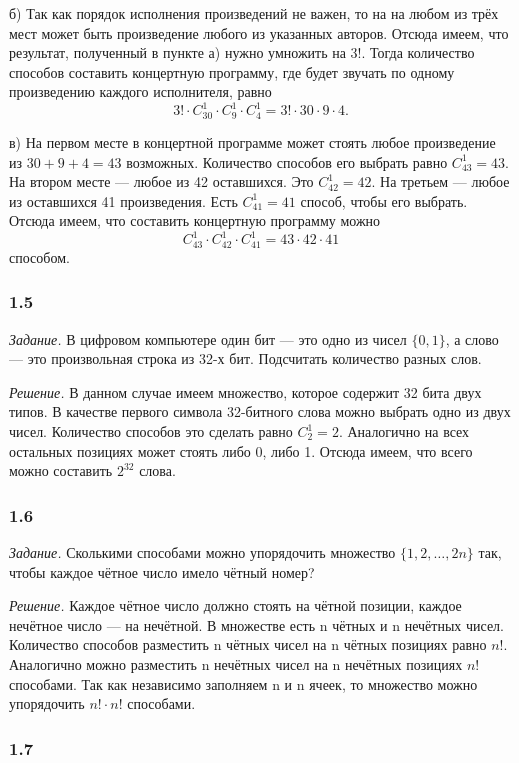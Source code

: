 \documentclass{book}
\begin{document}
б) Так как порядок исполнения произведений не важен, то на на любом из трёх мест может быть произведение любого из указанных авторов. Отсюда имеем, что результат, полученный в пункте а) нужно умножить на $3!$. Тогда количество способов составить концертную программу, где будет звучать по одному произведению каждого исполнителя, равно $$3!\cdot C_{30}^1\cdot C_9^1\cdot C_4^1=3!\cdot 30\cdot 9\cdot 4.$$

в) На первом месте в концертной программе может стоять любое произведение из $30+9+4=43$ возможных. Количество способов его выбрать равно $C_{43}^1=43$. На втором месте --- любое из 42 оставшихся. Это $C_{42}^1=42$. На третьем --- любое из оставшихся 41 произведения. Есть $C_{41}^1=41$ способ, чтобы его выбрать. Отсюда имеем, что составить концертную программу можно $$C_{43}^1\cdot C_{42}^1\cdot C_{41}^1=43\cdot 42\cdot 41$$ способом.

\subsubsection*{1.5}

\textit{Задание.} В цифровом компьютере один бит --- это одно из чисел $\{0, 1\}$, а слово --- это произвольная строка из 32-х бит. Подсчитать количество разных слов.

\textit{Решение.} В данном случае имеем множество, которое содержит 32 бита двух типов. В качестве первого символа 32-битного слова можно выбрать одно из двух чисел. Количество способов это сделать равно $C_{2}^1=2$. Аналогично на всех остальных позициях может стоять либо 0, либо 1. Отсюда имеем, что всего можно составить $2^{32}$ слова.

\subsubsection*{1.6}
\textit{Задание.} Сколькими способами можно упорядочить множество $\{1, 2,  \dotsc , 2n\}$ так, чтобы каждое чётное число имело чётный номер?

\textit{Решение.} Каждое чётное число должно стоять на чётной позиции, каждое нечётное число --- на нечётной. В множестве есть n чётных и n нечётных чисел. Количество способов разместить n чётных чисел на n чётных позициях равно $n!$. Аналогично можно разместить n нечётных чисел на n нечётных позициях $n!$ способами. Так как независимо заполняем n и n ячеек, то множество можно упорядочить $n!\cdot n!$ способами.

\subsubsection*{1.7}
\end{document}
